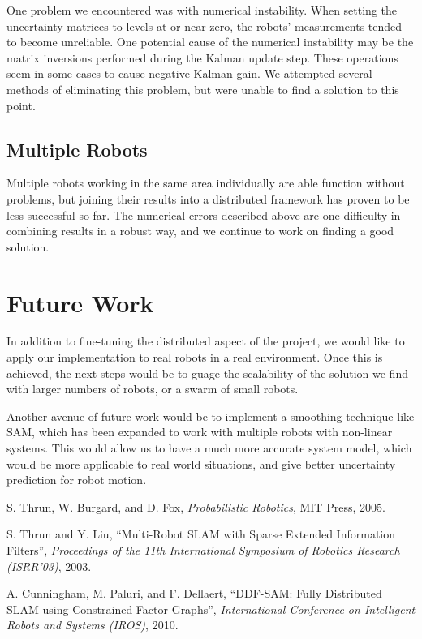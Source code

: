 \documentclass[prodmode,acmtecs]{acmsmall} %
\begin{document}
One problem we encountered was with numerical instability.  When setting the uncertainty matrices to levels at or near zero, the robots' measurements tended to become unreliable.  One potential cause of the numerical instability may be the matrix inversions performed during the Kalman update step.  These operations seem in some cases to cause negative Kalman gain.  We attempted several methods of eliminating this problem, but were unable to find a solution to this point.

\subsection{Multiple Robots}

Multiple robots working in the same area individually are able function without problems, but joining their results into a distributed framework has proven to be less successful so far.  The numerical errors described above are one difficulty in combining results in a robust way, and we continue to work on finding a good solution.

\section{Future Work}

In addition to fine-tuning the distributed aspect of the project, we would like to apply our implementation to real robots in a real environment.  Once this is achieved, the next steps would be to guage the scalability of the solution we find with larger numbers of robots, or a swarm of small robots.

Another avenue of future work would be to implement a smoothing technique like SAM, which has been expanded to work with multiple robots with non-linear systems. This would allow us to have a much more accurate system model, which would be more applicable to real world situations, and give better uncertainty prediction for robot motion.

\begin{thebibliography}{12}
        S. Thrun, W. Burgard, and D. Fox, \emph{Probabilistic Robotics}, MIT Press, 2005.

        S. Thrun and Y. Liu, ``Multi-Robot SLAM with Sparse Extended Information Filters'', \emph{Proceedings of the 11th International Symposium of Robotics Research (ISRR'03)}, 2003.

        A. Cunningham, M. Paluri, and F. Dellaert, ``DDF-SAM: Fully Distributed SLAM using Constrained Factor Graphs'', \emph{International Conference on Intelligent Robots and Systems (IROS)}, 2010.
\end{thebibliography}
\end{document}
